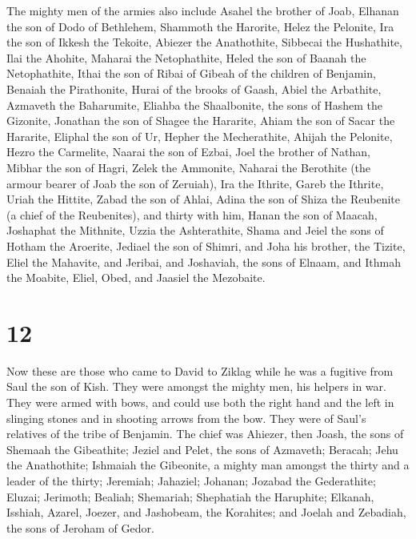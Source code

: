  The mighty men of the armies also include Asahel the
brother of Joab, Elhanan the son of Dodo of Bethlehem, 
Shammoth the Harorite, Helez the Pelonite,  Ira the son of
Ikkesh the Tekoite, Abiezer the Anathothite,  Sibbecai the
Hushathite, Ilai the Ahohite,  Maharai the Netophathite,
Heled the son of Baanah the Netophathite,  Ithai the son of
Ribai of Gibeah of the children of Benjamin, Benaiah the Pirathonite,
 Hurai of the brooks of Gaash, Abiel the Arbathite,
 Azmaveth the Baharumite, Eliahba the Shaalbonite,
 the sons of Hashem the Gizonite, Jonathan the son of
Shagee the Hararite,  Ahiam the son of Sacar the Hararite,
Eliphal the son of Ur,  Hepher the Mecherathite, Ahijah the
Pelonite,  Hezro the Carmelite, Naarai the son of Ezbai,
 Joel the brother of Nathan, Mibhar the son of Hagri,
 Zelek the Ammonite, Naharai the Berothite (the armour
bearer of Joab the son of Zeruiah),  Ira the Ithrite, Gareb
the Ithrite,  Uriah the Hittite, Zabad the son of Ahlai,
 Adina the son of Shiza the Reubenite (a chief of the
Reubenites), and thirty with him,  Hanan the son of Maacah,
Joshaphat the Mithnite,  Uzzia the Ashterathite, Shama and
Jeiel the sons of Hotham the Aroerite,  Jediael the son of
Shimri, and Joha his brother, the Tizite,  Eliel the
Mahavite, and Jeribai, and Joshaviah, the sons of Elnaam, and Ithmah the
Moabite,  Eliel, Obed, and Jaasiel the Mezobaite.

\hypertarget{section-11}{%
\section{12}\label{section-11}}

 Now these are those who came to David to Ziklag while he
was a fugitive from Saul the son of Kish. They were amongst the mighty
men, his helpers in war.  They were armed with bows, and
could use both the right hand and the left in slinging stones and in
shooting arrows from the bow. They were of Saul's relatives of the tribe
of Benjamin.  The chief was Ahiezer, then Joash, the sons of
Shemaah the Gibeathite; Jeziel and Pelet, the sons of Azmaveth; Beracah;
Jehu the Anathothite;  Ishmaiah the Gibeonite, a mighty man
amongst the thirty and a leader of the thirty; Jeremiah; Jahaziel;
Johanan; Jozabad the Gederathite;  Eluzai; Jerimoth;
Bealiah; Shemariah; Shephatiah the Haruphite;  Elkanah,
Isshiah, Azarel, Joezer, and Jashobeam, the Korahites;  and
Joelah and Zebadiah, the sons of Jeroham of Gedor.

